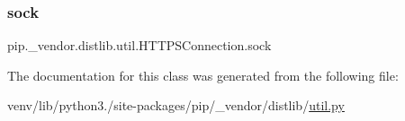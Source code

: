 \subsubsection{\texorpdfstring{sock}{sock}}
{\footnotesize\ttfamily pip.\+\_\+vendor.\+distlib.\+util.\+H\+T\+T\+P\+S\+Connection.\+sock}



The documentation for this class was generated from the following file\+:\begin{DoxyCompactItemize}
\item 
venv/lib/python3./site-\/packages/pip/\+\_\+vendor/distlib/\hyperlink{pip_2__vendor_2distlib_2util_8py}{util.\+py}\end{DoxyCompactItemize}
